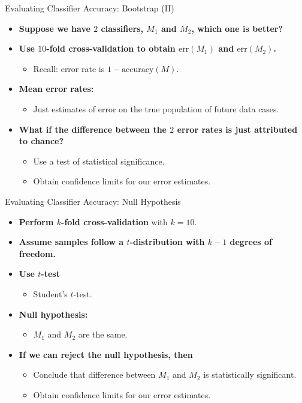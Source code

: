 \begin{frame}{Evaluating Classifier Accuracy: Bootstrap (II)}
	\begin{itemize}
		\item \textbf{Suppose we have $2$ classifiers, $M_1$ and $M_2$, which one is better?}
		\item \textbf{Use $10$-fold cross-validation to obtain $\overline{\text{err}}(M_1)$ and $\overline{\text{err}}(M_2)$.}
		      \begin{itemize}
			      \item Recall: error rate is $1-\text{accuracy}(M)$.
		      \end{itemize}
		\item \textbf{Mean error rates:}
		      \begin{itemize}
			      \item Just estimates of error on the true population of future data cases.
		      \end{itemize}
		\item \textbf{What if the difference between the $2$ error rates is just attributed to chance?}
		      \begin{itemize}
			      \item Use a test of statistical significance.
			      \item Obtain confidence limits for our error estimates.
		      \end{itemize}
	\end{itemize}
\end{frame}

\begin{frame}{Evaluating Classifier Accuracy: Null Hypothesis}
	\begin{itemize}
		\item \textbf{Perform $k$-fold cross-validation} with $k=10$.
		\item \textbf{Assume samples follow a $t$-distribution with $k-1$ degrees of freedom.}
		\item \textbf{Use $t$-test}
		      \begin{itemize}
			      \item Student's $t$-test.
		      \end{itemize}
		\item \textbf{Null hypothesis:}
		      \begin{itemize}
			      \item $M_1$ and $M_2$ are the same.
		      \end{itemize}
		\item \textbf{If we can reject the null hypothesis, then}
		      \begin{itemize}
			      \item Conclude that difference between $M_1$ and $M_2$ is statistically significant.
			      \item Obtain confidence limits for our error estimates.
		      \end{itemize}
	\end{itemize}
\end{frame}

